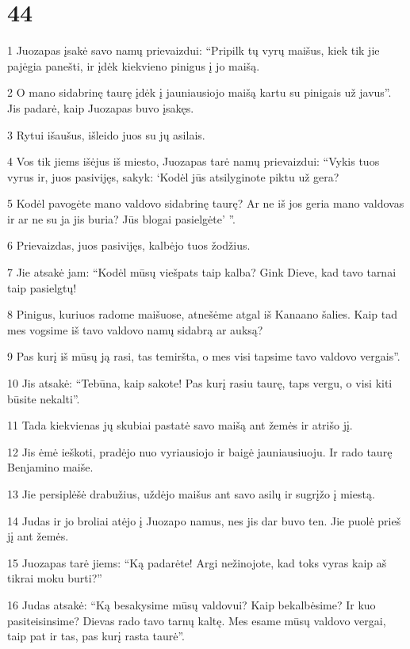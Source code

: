 \chapter{44}

\par 1 Juozapas įsakė savo namų prievaizdui: “Pripilk tų vyrų maišus, kiek tik jie pajėgia panešti, ir įdėk kiekvieno pinigus į jo maišą. 
\par 2 O mano sidabrinę taurę įdėk į jauniausiojo maišą kartu su pinigais už javus”. Jis padarė, kaip Juozapas buvo įsakęs. 
\par 3 Rytui išaušus, išleido juos su jų asilais. 
\par 4 Vos tik jiems išėjus iš miesto, Juozapas tarė namų prievaizdui: “Vykis tuos vyrus ir, juos pasivijęs, sakyk: ‘Kodėl jūs atsilyginote piktu už gera? 
\par 5 Kodėl pavogėte mano valdovo sidabrinę taurę? Ar ne iš jos geria mano valdovas ir ar ne su ja jis buria? Jūs blogai pasielgėte’ ”. 
\par 6 Prievaizdas, juos pasivijęs, kalbėjo tuos žodžius. 
\par 7 Jie atsakė jam: “Kodėl mūsų viešpats taip kalba? Gink Dieve, kad tavo tarnai taip pasielgtų! 
\par 8 Pinigus, kuriuos radome maišuose, atnešėme atgal iš Kanaano šalies. Kaip tad mes vogsime iš tavo valdovo namų sidabrą ar auksą? 
\par 9 Pas kurį iš mūsų ją rasi, tas temiršta, o mes visi tapsime tavo valdovo vergais”. 
\par 10 Jis atsakė: “Tebūna, kaip sakote! Pas kurį rasiu taurę, taps vergu, o visi kiti būsite nekalti”. 
\par 11 Tada kiekvienas jų skubiai pastatė savo maišą ant žemės ir atrišo jį. 
\par 12 Jis ėmė ieškoti, pradėjo nuo vyriausiojo ir baigė jauniausiuoju. Ir rado taurę Benjamino maiše. 
\par 13 Jie persiplėšė drabužius, uždėjo maišus ant savo asilų ir sugrįžo į miestą. 
\par 14 Judas ir jo broliai atėjo į Juozapo namus, nes jis dar buvo ten. Jie puolė prieš jį ant žemės. 
\par 15 Juozapas tarė jiems: “Ką padarėte! Argi nežinojote, kad toks vyras kaip aš tikrai moku burti?” 
\par 16 Judas atsakė: “Ką besakysime mūsų valdovui? Kaip bekalbėsime? Ir kuo pasiteisinsime? Dievas rado tavo tarnų kaltę. Mes esame mūsų valdovo vergai, taip pat ir tas, pas kurį rasta taurė”. 
